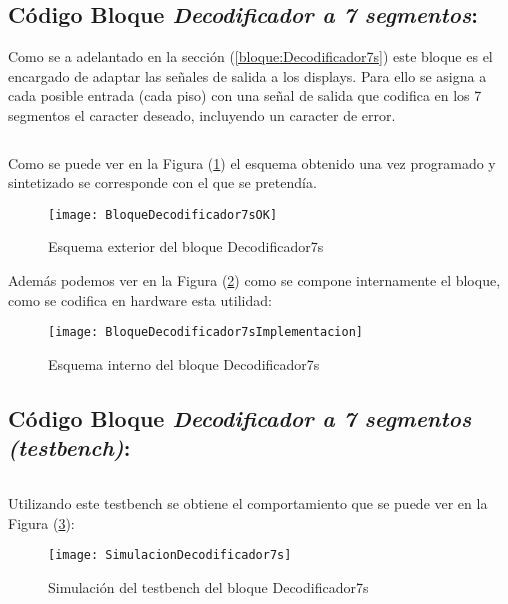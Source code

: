 ﻿\subsection{Código Bloque \textit{Decodificador a 7 segmentos}:} \label{code:Decodificador7s}
	Como se a adelantado en la sección (\ref{bloque:Decodificador7s}) este bloque es el encargado de adaptar las señales de salida a los displays. Para ello se asigna a cada posible entrada (cada piso) con una señal de salida que codifica en los 7 segmentos el caracter deseado, incluyendo un caracter de error.

	\inputminted[frame=lines,fontsize=\footnotesize,linenos]{vhdl}{CodeFiles/Decodificador7s.vhd}
	
	Como se puede ver en la Figura (\ref{fig:BloqueDecodificador7sOK}) el esquema obtenido una vez programado y sintetizado se corresponde con el que se pretendía.
    \begin{figure}[H]
		    \centering
		    \texttt{[image: BloqueDecodificador7sOK]}
		    \caption{Esquema exterior del bloque Decodificador7s}
		    \label{fig:BloqueDecodificador7sOK}
	\end{figure}
    Además podemos ver en la Figura (\ref{fig:BloqueDecodificador7sImplementacion}) como se compone internamente el bloque, como se codifica en hardware esta utilidad:
    \begin{figure}[H]
		    \centering
		    \texttt{[image: BloqueDecodificador7sImplementacion]}
		    \caption{Esquema interno del bloque Decodificador7s}
		    \label{fig:BloqueDecodificador7sImplementacion}
	\end{figure}

\subsection{Código Bloque \textit{Decodificador a 7 segmentos (testbench)}:} \label{code:Decodificador7s_tb}
	
	\inputminted[frame=lines,fontsize=\footnotesize,linenos]{vhdl}{CodeFiles/Decodificador7s_tb.vhd}
	
	Utilizando este testbench se obtiene el comportamiento que se puede ver en la Figura (\ref{fig:SimulacionDecodificador7s}):

    \begin{figure}[H]
		    \centering
		    \texttt{[image: SimulacionDecodificador7s]}
		    \caption{Simulación del testbench del bloque Decodificador7s}
		    \label{fig:SimulacionDecodificador7s}
	\end{figure}

